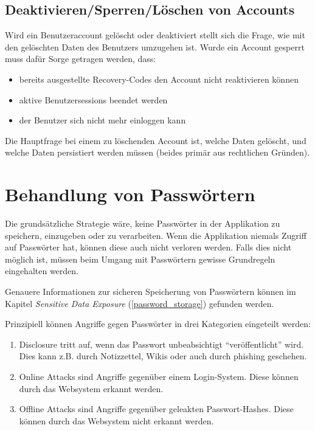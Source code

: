 \subsection{Deaktivieren/Sperren/Löschen von Accounts}

Wird ein Benutzeraccount gelöscht oder deaktiviert stellt sich die Frage, wie mit den gelöschten Daten des Benutzers umzugehen ist. Wurde ein Account gesperrt muss dafür Sorge getragen werden, dass:

\begin{itemize}
	\item bereits ausgestellte Recovery-Codes den Account nicht reaktivieren können
	\item aktive Benutzersessions beendet werden
	\item der Benutzer sich nicht mehr einloggen kann
\end{itemize}

Die Hauptfrage bei einem zu löschenden Account ist, welche Daten gelöscht, und welche Daten persistiert werden müssen (beides primär aus rechtlichen Gründen).

\section{Behandlung von Passwörtern}

Die grundsätzliche Strategie wäre, keine Passwörter in der Applikation zu speichern, einzugeben oder zu verarbeiten. Wenn die Applikation niemals Zugriff auf Passwörter hat, können diese auch nicht verloren werden. Falls dies nicht möglich ist, müssen beim Umgang mit Passwörtern gewisse Grundregeln eingehalten werden.

Genauere Informationen zur sicheren Speicherung von Passwörtern können im Kapitel \textit{Sensitive Data Exposure} (\ref{password_storage}) gefunden werden.

Prinzipiell können Angriffe gegen Passwörter in drei Kategorien eingeteilt werden:

\begin{enumerate}
	\item Disclosure tritt auf, wenn das Passwort unbeabsichtigt ``veröffentlicht'' wird. Dies kann z.B. durch Notizzettel, Wikis oder auch durch phishing geschehen.
	\item Online Attacks sind Angriffe gegenüber einem Login-System. Diese können durch das Websystem erkannt werden.
	\item Offline Attacks sind Angriffe gegenüber geleakten Passwort-Hashes. Diese können durch das Websystem nicht erkannt werden.
\end{enumerate}

